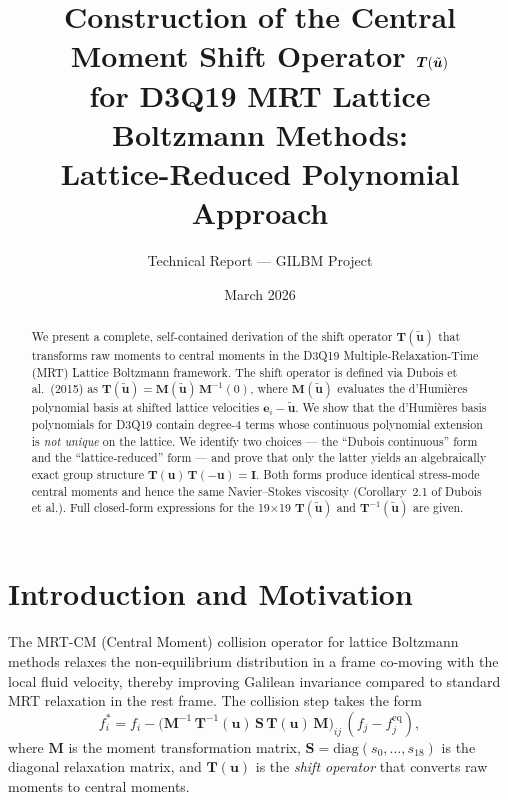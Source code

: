 \documentclass[11pt,a4paper]{article}
\title{Construction of the Central Moment Shift Operator $\Tmat(\tilde{\vect{u}})$\\
for D3Q19 MRT Lattice Boltzmann Methods:\\
Lattice-Reduced Polynomial Approach}
\author{Technical Report --- GILBM Project}
\date{March 2026}
\newcommand{\vect}[1]{\bm{#1}}
\newcommand{\mat}[1]{\bm{#1}}
\newcommand{\feq}{f^{\mathrm{eq}}}
\newcommand{\Tmat}{\mat{T}}
\newcommand{\Mmat}{\mat{M}}
\newcommand{\Smat}{\mat{S}}
\newcommand{\Imat}{\mat{I}}
\begin{document}
\maketitle

\begin{abstract}
We present a complete, self-contained derivation of the shift operator $\Tmat(\tilde{\vect{u}})$ that transforms raw moments to central moments in the D3Q19 Multiple-Relaxation-Time (MRT) Lattice Boltzmann framework.
The shift operator is defined via Dubois et al.\ (2015) as $\Tmat(\tilde{\vect{u}}) = \Mmat(\tilde{\vect{u}})\,\Mmat^{-1}(0)$, where $\Mmat(\tilde{\vect{u}})$ evaluates the d'Humi\`eres polynomial basis at shifted lattice velocities $\vect{e}_i - \tilde{\vect{u}}$.
We show that the d'Humi\`eres basis polynomials for D3Q19 contain degree-4 terms whose continuous polynomial extension is \emph{not unique} on the lattice.
We identify two choices --- the ``Dubois continuous'' form and the ``lattice-reduced'' form --- and prove that only the latter yields an algebraically exact group structure $\Tmat(\vect{u})\,\Tmat(-\vect{u}) = \Imat$.
Both forms produce identical stress-mode central moments and hence the same Navier--Stokes viscosity (Corollary~2.1 of Dubois et al.).
Full closed-form expressions for the 19$\times$19 $\Tmat(\tilde{\vect{u}})$ and $\Tmat^{-1}(\tilde{\vect{u}})$ are given.
\end{abstract}

\tableofcontents
\newpage

\section{Introduction and Motivation}

The MRT-CM (Central Moment) collision operator for lattice Boltzmann methods relaxes the non-equilibrium distribution in a frame co-moving with the local fluid velocity, thereby improving Galilean invariance compared to standard MRT relaxation in the rest frame.
The collision step takes the form
\begin{equation}\label{eq:collision}
  f_i^* = f_i - \bigl(\Mmat^{-1}\,\Tmat^{-1}(\vect{u})\,\Smat\,\Tmat(\vect{u})\,\Mmat\bigr)_{ij}\,(f_j - \feq_j),
\end{equation}
where $\Mmat$ is the moment transformation matrix, $\Smat = \mathrm{diag}(s_0,\ldots,s_{18})$ is the diagonal relaxation matrix, and $\Tmat(\vect{u})$ is the \emph{shift operator} that converts raw moments to central moments.
\end{document}
